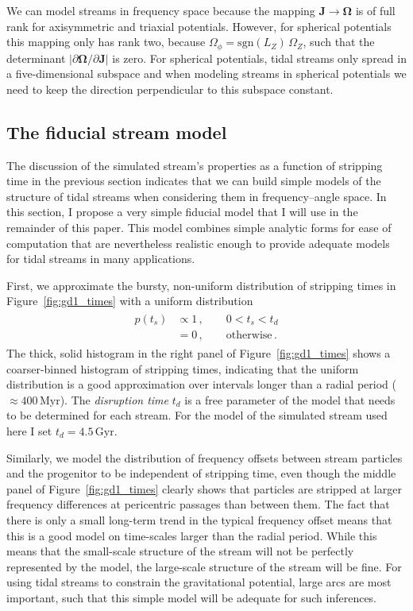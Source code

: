 \documentclass{emulateapj}
\renewcommand{\figurename}{Figure}
\renewcommand{\vec}[1]{\ensuremath{\mathbf{#1}}}
\newcommand{\vecj}{\ensuremath{\vec{J}}}
\newcommand{\veco}{\ensuremath{\vec{\Omega}}}
\newcommand{\Myr}{\ensuremath{\,\mathrm{Myr}}}
\newcommand{\Gyr}{\ensuremath{\,\mathrm{Gyr}}}
\newcommand{\ts}{\ensuremath{t_s}}
\begin{document}
We can model streams in frequency space because the mapping $\vecj
\rightarrow \veco$ is of full rank for axisymmetric and triaxial
potentials. However, for spherical potentials this mapping only has
rank two, because $\Omega_\phi = \mathrm{sgn}(L_Z)\,\Omega_Z$, such
that the determinant $|\partial \veco / \partial \vecj|$ is zero. For
spherical potentials, tidal streams only spread in a five-dimensional
subspace and when modeling streams in spherical potentials we need to
keep the direction perpendicular to this subspace constant.

\subsection{The fiducial stream model}\label{sec:fidmodel}

The discussion of the simulated stream's properties as a function of
stripping time in the previous section indicates that we can build
simple models of the structure of tidal streams when considering them
in frequency--angle space. In this section, I propose a very simple
fiducial model that I will use in the remainder of this paper. This
model combines simple analytic forms for ease of computation that are
nevertheless realistic enough to provide adequate models for tidal
streams in many applications.

First, we approximate the bursty, non-uniform distribution of
stripping times in \figurename~\ref{fig:gd1_times} with a uniform
distribution
\begin{align}\label{eq:pt}
  \begin{split}
    p(\ts) & \propto 1\,,\qquad 0 < \ts < t_d\\
    & = 0\,,\qquad \mathrm{otherwise}\,.
  \end{split}
\end{align}
The thick, solid histogram in the right panel of
\figurename~\ref{fig:gd1_times} shows a coarser-binned histogram of
stripping times, indicating that the uniform distribution is a good
approximation over intervals longer than a radial period ($\approx
400\Myr$). The \emph{disruption time} $t_d$ is a free parameter of the
model that needs to be determined for each stream. For the model of
the simulated stream used here I set $t_d = 4.5\Gyr$.

Similarly, we model the distribution of frequency offsets between
stream particles and the progenitor to be independent of stripping
time, even though the middle panel of \figurename~\ref{fig:gd1_times}
clearly shows that particles are stripped at larger frequency
differences at pericentric passages than between them. The fact that
there is only a small long-term trend in the typical frequency offset
means that this is a good model on time-scales larger than the radial
period. While this means that the small-scale structure of the stream
will not be perfectly represented by the model, the large-scale
structure of the stream will be fine. For using tidal streams to
constrain the gravitational potential, large arcs are most important,
such that this simple model will be adequate for such inferences.
\end{document}
